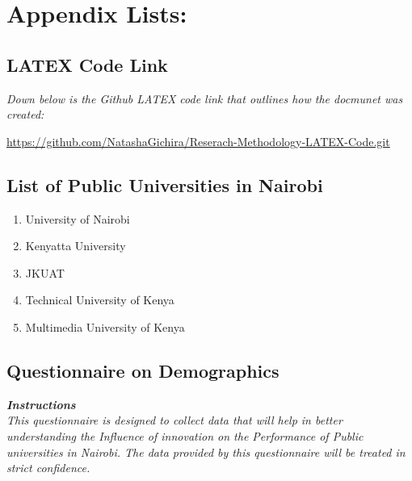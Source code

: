 \chapter{\huge{\textbf{Appendix Lists:}}}

\section{\textbf{LATEX Code Link}}
\textit{Down below is the Github LATEX code link that outlines how the docmunet was created:}

\url{https://github.com/NatashaGichira/Reserach-Methodology-LATEX-Code.git}

\section{\textbf{List of Public Universities in Nairobi}}
\begin{enumerate}

    \item University of Nairobi
    
    \item Kenyatta University
    
    \item JKUAT
    
    \item Technical University of Kenya
    
    \item Multimedia University of Kenya

\end{enumerate}

\section{\textbf{Questionnaire on Demographics}}

\textit{\textbf{Instructions}\\ This questionnaire is designed to collect data that will help in better understanding the Influence of innovation on the Performance of Public universities in Nairobi. The data provided by this questionnaire will be treated in strict confidence.}

